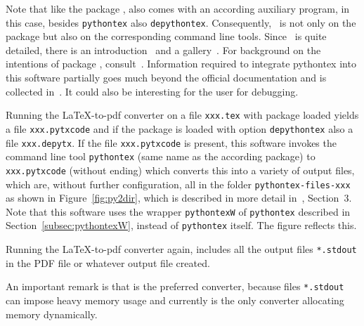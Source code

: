 Note that like the package , also  
comes with an according auxiliary program, 
in this case, besides \texttt{pythontex} also \texttt{depythontex}. 
Consequently,~\cite{PythonTexP} is not only on the package 
but also on the corresponding command line tools. 
Since~\cite{PythonTexP} is quite detailed, 
there is an introduction~\cite{PythonTexQ} and a gallery~\cite{PythonTexG}. 
For background on the intentions of package , consult~\cite{PythonTexRepr}. 
Information required to integrate pythontex into this software 
partially goes much beyond the official documentation and is collected in~\cite{PyTexInOut}. 
It could also be interesting for the user for debugging. 

Running the \LaTeX-to-pdf converter on a file \texttt{xxx.tex} 
with package  loaded 
yields a file \texttt{xxx.pytxcode} 
and if the package is loaded with option \texttt{depythontex} 
also a file \texttt{xxx.depytx}.
If the file \texttt{xxx.pytxcode} is present, 
this software invokes the command line tool \texttt{pythontex} 
(same name as the according package) 
to \texttt{xxx.pytxcode} (without ending) 
which converts this into a variety of output files, 
which are, without further configuration, 
all in the folder \texttt{pythontex-files-xxx}
as shown in Figure~\ref{fig:py2dir}, 
which is described in more detail in~\cite{PyTexInOut}, Section~3. 
Note that this software uses the wrapper \texttt{pythontexW} 
of \texttt{pythontex} described in Section~\ref{subsec:pythontexW}, 
instead of \texttt{pythontex} itself. 
The figure reflects this. 


Running the \LaTeX-to-pdf converter again, 
includes all the output files \texttt{*.stdout} 
in the PDF file or whatever output file created. 


An important remark is that \lualatex{} is the preferred converter, 
because files \texttt{*.stdout} can impose heavy memory usage 
and currently \lualatex{} is the only converter allocating memory dynamically. 


